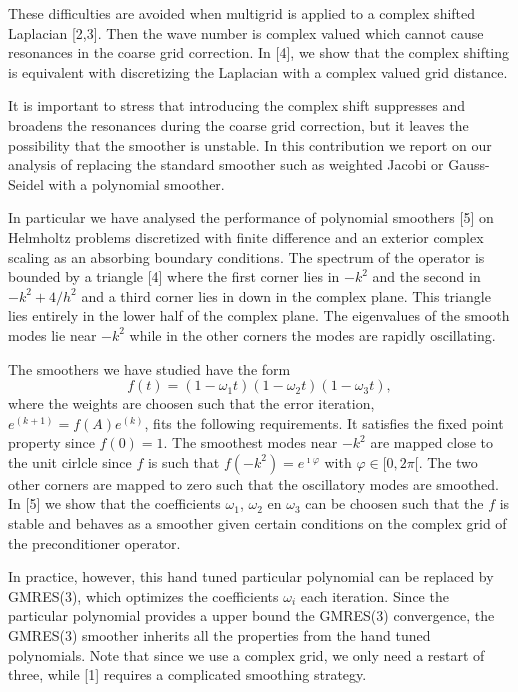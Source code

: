 \documentclass{report}
\begin{document}
These difficulties are avoided when multigrid is applied to a complex
shifted Laplacian [2,3]. Then the wave number is complex
valued which cannot cause resonances in the coarse grid correction.
In [4], we show that the complex shifting is equivalent with
discretizing the Laplacian with a complex valued grid distance.

It is important to stress that introducing the complex shift
suppresses and broadens the resonances during the coarse grid
correction, but it leaves the possibility that the smoother is
unstable. In this contribution we report on our analysis of replacing
the standard smoother such as weighted Jacobi or Gauss-Seidel with a
polynomial smoother.

In particular we have analysed the performance of polynomial
smoothers [5] on Helmholtz problems discretized with finite
difference and an exterior complex scaling as an absorbing boundary
conditions. The spectrum of the operator is bounded by a
triangle [4] where the first corner lies in $-k^2$ and
the second in $-k^2+4/h^2$ and a third corner lies in down in the
complex plane. This triangle lies entirely in the lower half of the
complex plane. The eigenvalues of the smooth modes lie near $-k^2$ while
in the other corners the modes are rapidly oscillating.

The smoothers we have studied have the form
\begin{equation}
f(t) = (1 -\omega_1 t) (1 -\omega_2 t)(1 -\omega_3 t),
\end{equation}
where the weights are choosen such that the error iteration,
$e^{(k+1)} = f(A) e^{(k)}$, fits the following requirements. It
satisfies the fixed point property since $f(0)=1$. The smoothest
modes near $-k^2$ are mapped close to the unit cirlcle since $f$ is
such that $f(-k^2)=e^{\imath\varphi}$ with $\varphi \in [0,2\pi[$. The
two other corners are
mapped to zero such that the oscillatory modes are
smoothed. In [5] we show that the coefficients $\omega_1$,
$\omega_2$ en $\omega_3$ can be choosen such that the $f$ is stable and
behaves as a smoother given certain conditions on the complex grid of
the preconditioner operator.

In practice, however, this hand tuned particular polynomial can be
replaced by GMRES(3), which optimizes the coefficients $\omega_i$ each
iteration. Since the particular polynomial provides a upper bound the
GMRES(3) convergence, the GMRES(3) smoother inherits all the
properties from the hand tuned polynomials. Note that since we use a
complex grid, we only need a restart of three, while [1]
requires a complicated smoothing strategy.
\end{document}
